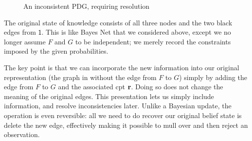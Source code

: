 \documentclass{article}
\newcommand{\MN}{PDG}
\numberwithin{equation}{section}
\begin{document}
\begin{example}
\begin{figure}[h]
{
			}
			\caption{An inconsistent \MN, requiring resolution}
			\label{fig:gun-floomp-diagram}
		\end{figure}


		The original state of knowledge consists of all three nodes and the two black edges from $\mathsf 1$. This is like Bayes Net that we considered above, except we no longer assume $F$ and $G$ to be independent; we merely record the constraints imposed by the given probabilities.
	
		The key point is that we can incorporate the new information into
		our original representation (the graph in 
		without the edge from $F$ to $G$) simply  by adding the edge from $F$
		to $G$ and the associated cpt $\mathbf r$.  Doing so does not change the meaning
		of the original edges.  This presentation lets us simply include
		information, and resolve inconsistencies later. Unlike a Bayesian
		update, the operation is even reversible: all we need to do recover
		our original belief state is delete the new edge, effectively making
		it possible to mull over and then reject an observation.
	\end{example}
\end{document}
